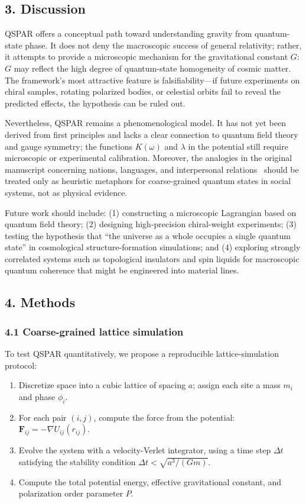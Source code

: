 \documentclass[12pt,a4paper]{article}
\begin{document}
\subsection*{3. Discussion}

QSPAR offers a conceptual path toward understanding gravity from quantum-state phase. It does not deny the macroscopic success of general relativity; rather, it attempts to provide a microscopic mechanism for the gravitational constant $G$: $G$ may reflect the high degree of quantum-state homogeneity of cosmic matter. The framework's most attractive feature is falsifiability---if future experiments on chiral samples, rotating polarized bodies, or celestial orbits fail to reveal the predicted effects, the hypothesis can be ruled out.

Nevertheless, QSPAR remains a phenomenological model. It has not yet been derived from first principles and lacks a clear connection to quantum field theory and gauge symmetry; the functions $K(\omega)$ and $\lambda$ in the potential still require microscopic or experimental calibration. Moreover, the analogies in the original manuscript concerning nations, languages, and interpersonal relations~\cite{mcpherson2001} should be treated only as heuristic metaphors for coarse-grained quantum states in social systems, not as physical evidence.

Future work should include: (1) constructing a microscopic Lagrangian based on quantum field theory; (2) designing high-precision chiral-weight experiments; (3) testing the hypothesis that ``the universe as a whole occupies a single quantum state'' in cosmological structure-formation simulations; and (4) exploring strongly correlated systems such as topological insulators and spin liquids for macroscopic quantum coherence that might be engineered into material lines.

\subsection*{4. Methods}

\subsubsection*{4.1 Coarse-grained lattice simulation}

To test QSPAR quantitatively, we propose a reproducible lattice-simulation protocol:

\begin{enumerate}
  \item Discretize space into a cubic lattice of spacing $a$; assign each site a mass $m_i$ and phase $\phi_i$.
  \item For each pair $(i,j)$, compute the force from the potential: $\mathbf{F}_{ij}=-\nabla U_{ij}(r_{ij})$.
  \item Evolve the system with a velocity-Verlet integrator, using a time step $\Delta t$ satisfying the stability condition $\Delta t < \sqrt{a^3/(Gm)}$.
  \item Compute the total potential energy, effective gravitational constant, and polarization order parameter $P$.
\end{enumerate}
\end{document}
